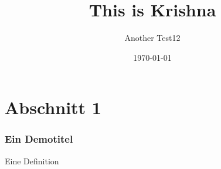 \documentclass{beamer}
\title{This is Krishna }
\author{Another Test12}
\date{\today}
\begin{document}
\maketitle
\frame{\tableofcontents[currentsection]}

\section{Abschnitt 1}
\begin{frame} %
  \frametitle{Ein Demotitel} %
  \begin{Definition} %
    Eine Definition
  \end{Definition}
\end{frame}
\end{document}
